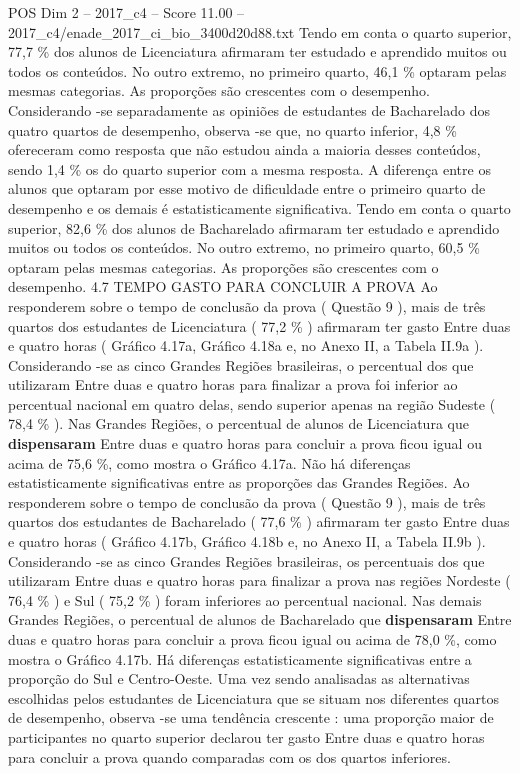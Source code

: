 \begin{textsample}{POS Dim 2 – 2017\_c4 – Score 11.00 – 2017\_c4/enade\_2017\_ci\_bio\_3400d20d88.txt}
Tendo em conta o quarto superior, 77,7 \% dos alunos de Licenciatura afirmaram ter estudado e aprendido muitos ou todos os conteúdos.
No outro extremo, no primeiro quarto, 46,1 \% optaram pelas mesmas categorias.
As proporções são crescentes com o desempenho.
Considerando -se separadamente as opiniões de estudantes de Bacharelado dos quatro quartos de desempenho, observa -se que, no quarto inferior, 4,8 \% ofereceram como resposta que não estudou ainda a maioria desses conteúdos, sendo 1,4 \% os do quarto superior com a mesma resposta.
A diferença entre os alunos que optaram por esse motivo de dificuldade entre o primeiro quarto de desempenho e os demais é estatisticamente significativa.
Tendo em conta o quarto superior, 82,6 \% dos alunos de Bacharelado afirmaram ter estudado e aprendido muitos ou todos os conteúdos.
No outro extremo, no primeiro quarto, 60,5 \% optaram pelas mesmas categorias.
As proporções são crescentes com o desempenho. 4.7 TEMPO GASTO PARA CONCLUIR A PROVA Ao responderem sobre o tempo de conclusão da prova ( Questão 9 ), mais de três quartos dos estudantes de Licenciatura ( 77,2 \% ) afirmaram ter gasto Entre duas e quatro horas ( Gráfico 4.17a, Gráfico 4.18a e, no Anexo II, a Tabela II.9a ).
Considerando -se as cinco Grandes Regiões brasileiras, o percentual dos que utilizaram Entre duas e quatro horas para finalizar a prova foi inferior ao percentual nacional em quatro delas, sendo superior apenas na região Sudeste ( 78,4 \% ).
Nas Grandes Regiões, o percentual de alunos de Licenciatura que \textbf{dispensaram} Entre duas e quatro horas para concluir a prova ficou igual ou acima de 75,6 \%, como mostra o Gráfico 4.17a.
Não há diferenças estatisticamente significativas entre as proporções das Grandes Regiões.
Ao responderem sobre o tempo de conclusão da prova ( Questão 9 ), mais de três quartos dos estudantes de Bacharelado ( 77,6 \% ) afirmaram ter gasto Entre duas e quatro horas ( Gráfico 4.17b, Gráfico 4.18b e, no Anexo II, a Tabela II.9b ).
Considerando -se as cinco Grandes Regiões brasileiras, os percentuais dos que utilizaram Entre duas e quatro horas para finalizar a prova nas regiões Nordeste ( 76,4 \% ) e Sul ( 75,2 \% ) foram inferiores ao percentual nacional.
Nas demais Grandes Regiões, o percentual de alunos de Bacharelado que \textbf{dispensaram} Entre duas e quatro horas para concluir a prova ficou igual ou acima de 78,0 \%, como mostra o Gráfico 4.17b.
Há diferenças estatisticamente significativas entre a proporção do Sul e Centro-Oeste.
Uma vez sendo analisadas as alternativas escolhidas pelos estudantes de Licenciatura que se situam nos diferentes quartos de desempenho, observa -se uma tendência crescente : uma proporção maior de participantes no quarto superior declarou ter gasto Entre duas e quatro horas para concluir a prova quando comparadas com os dos quartos inferiores.

\end{textsample}

